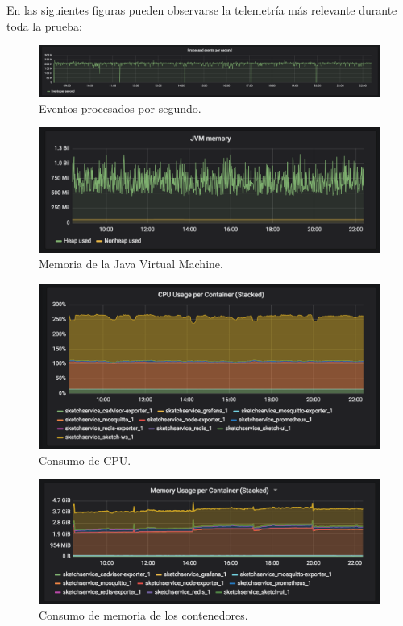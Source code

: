 \documentclass[a4paper,12pt, oneside]{article}
\begin{document}
En las siguientes figuras pueden observarse la telemetría más relevante durante toda la prueba:
\begin{figure}[h]
	\centering
	\includegraphics[width=1\textwidth]{./graph/processed_evts_per_second.png}
	\caption{Eventos procesados por segundo.}
	\label{diag:processed_evts_per_second}
\end{figure}
\begin{figure}[h]
	\centering
	\includegraphics[width=1\textwidth]{./graph/jvm_memory.png}
	\caption{Memoria de la Java Virtual Machine.}
	\label{diag:jvm_memory}
\end{figure}
\begin{figure}[h]
	\centering
	\includegraphics[width=1\textwidth]{./graph/cpu_usage.png}
	\caption{Consumo de CPU.}
	\label{diag:cpu_usage}
\end{figure}
\begin{figure}[h]
	\centering
	\includegraphics[width=1\textwidth]{./graph/memory_usage.png}
	\caption{Consumo de memoria de los contenedores.}
	\label{diag:memory_usage}
\end{figure}
\clearpage
\end{document}
